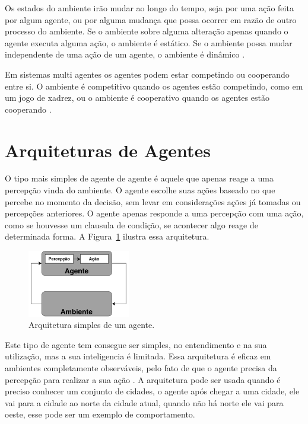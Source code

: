 Os estados do ambiente irão mudar ao longo do tempo, seja por uma ação feita por algum agente, ou por alguma mudança que possa ocorrer em razão de outro processo do ambiente. Se o ambiente sobre alguma alteração apenas quando o agente executa alguma ação, o ambiente é estático. Se o ambiente possa mudar independente de uma ação de um agente, o ambiente é dinâmico \cite{agent1999}.

Em sistemas multi agentes os agentes podem estar competindo ou cooperando entre si. O ambiente é competitivo quando os agentes estão competindo, como em um jogo de xadrez, ou o ambiente é cooperativo quando os agentes estão cooperando \cite{intelligence2003modern}.

\section{Arquiteturas de Agentes}


O tipo mais simples de agente de agente é aquele que apenas reage a uma percepção vinda do ambiente. O agente escolhe suas ações baseado no que percebe no momento da decisão, sem levar em considerações ações já tomadas ou percepções anteriores. O agente apenas responde a uma percepção com uma ação, como se houvesse um clausula de condição, se acontecer algo reage de determinada forma.  A Figura~\ref{fig:agenteSimple} ilustra essa arquitetura. 

\begin{figure}[ht]
	\centering
	\includegraphics[width=0.4\textwidth]{fig/agentSimple.pdf}
	\caption{Arquitetura simples de um agente.}
	\label{fig:agenteSimple}
\end{figure} 


Este tipo de agente tem consegue ser simples, no entendimento e na sua utilização, mas a sua inteligencia é limitada. Essa arquitetura é eficaz em ambientes completamente observáveis, pelo fato de que o agente precisa da percepção para realizar a sua ação \cite{intelligence2003modern}. A arquitetura pode ser usada quando é preciso conhecer um conjunto de cidades, o agente após chegar a uma cidade, ele vai para a cidade ao norte da cidade atual, quando não há norte ele vai para oeste, esse pode ser um exemplo de comportamento. 


